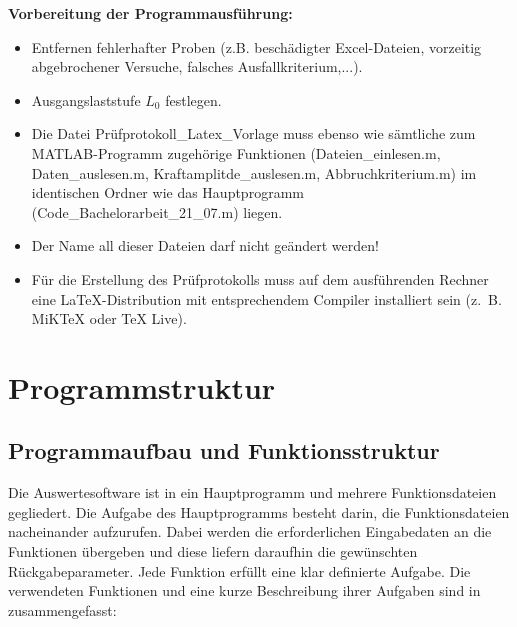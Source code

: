 	\textbf{Vorbereitung der Programmausführung:}
	   \begin{itemize}
	   \item Entfernen fehlerhafter Proben (z.B. beschädigter Excel-Dateien, vorzeitig abgebrochener Versuche, falsches Ausfallkriterium,...).
   	   \item Ausgangslaststufe $L_0$ festlegen.
   	    \item Die Datei Prüfprotokoll\_Latex\_Vorlage muss ebenso wie sämtliche zum MATLAB-Programm zugehörige Funktionen (Dateien\_einlesen.m, Daten\_auslesen.m, Kraftamplitde\_auslesen.m, Abbruchkriterium.m) im identischen Ordner wie das Hauptprogramm (Code\_Bachelorarbeit\_21\_07.m) liegen.
   	    \item Der Name all dieser Dateien darf nicht geändert werden!
   	    \item Für die Erstellung des Prüfprotokolls muss auf dem ausführenden Rechner eine LaTeX-Distribution mit entsprechendem Compiler installiert sein (z.~B. MiKTeX oder TeX Live).
   	    \end{itemize}

		
	\section{Programmstruktur}
	\subsection{Programmaufbau und Funktionsstruktur}
	Die Auswertesoftware ist in ein Hauptprogramm und mehrere Funktionsdateien gegliedert. Die Aufgabe des Hauptprogramms besteht darin, die Funktionsdateien nacheinander aufzurufen. Dabei werden die erforderlichen Eingabedaten an die Funktionen übergeben und diese liefern daraufhin die gewünschten Rückgabeparameter.
	 Jede Funktion erfüllt eine klar definierte Aufgabe. Die verwendeten Funktionen und eine kurze Beschreibung ihrer Aufgaben sind in  zusammengefasst:
	
